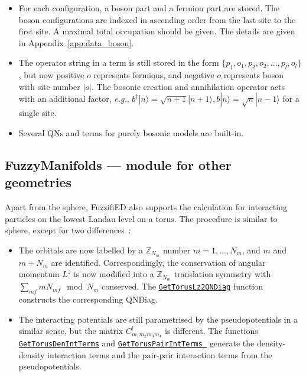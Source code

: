 \documentclass{timesjhep}
\begin{document}
\begin{itemize}
    \item For each configuration, a boson part and a fermion part are stored. The boson configurations are indexed in ascending order from the last site to the first site. A maximal total occupation should be given. The details are given in Appendix~\ref{app:data_boson}.
    \item The operator string in a term is still stored in the form $\{p_1,o_1,p_2,o_2,\dots,p_l,o_l\}$, but now positive $o$ represents fermions, and negative $o$ represents boson with site number $|o|$. The bosonic creation and annihilation operator acts with an additional factor, \textit{e.g.}, $b^\dagger|n\rangle=\sqrt{n+1}|n+1\rangle,b|n\rangle=\sqrt{n}|n-1\rangle$ for a single site.
    \item Several QNs and terms for purely bosonic models are built-in.
\end{itemize}

\subsection{FuzzyManifolds --- module for other geometries}
\label{sec:ed_manifolds}

Apart from the sphere, FuzzifiED also supports the calculation for interacting particles on the lowest Landau level on a torus. The procedure is similar to sphere, except for two differences~:
\begin{itemize}
    \item The orbitals are now labelled by a $\mathbb{Z}_{N_m}$ number $m=1,\dots,N_m$, and $m$ and $m+N_m$ are identified. Correspondingly, the conservation of angular momentum $L^z$ is now modified into a $\mathbb{Z}_{N_m}$ translation symmetry with $\sum_{mf}mN_{mf}\mod N_m$ conserved. The \href{https://docs.fuzzified.world/manifolds/#FuzzifiED.FuzzyManifolds.GetTorusLz2QNDiag-Tuple{Int64,\%20Int64}}{\lstinline|GetTorusLz2QNDiag|} function constructs the corresponding QNDiag.
    \item The interacting potentials are still parametrised by the pseudopotentials in a similar sense, but the matrix $C_{m_1m_2m_3m_4}^l$ is different. The functions \href{https://docs.fuzzified.world/manifolds/#FuzzifiED.FuzzyManifolds.GetTorusDenIntTerms}{\lstinline|GetTorusDenIntTerms|} and \href{https://docs.fuzzified.world/manifolds/#FuzzifiED.FuzzyManifolds.GetTorusPairIntTerms}{\lstinline|GetTorusPairIntTerms |} generate the density-density interaction terms and the pair-pair interaction terms from the pseudopotentials.
\end{itemize}
\end{document}
